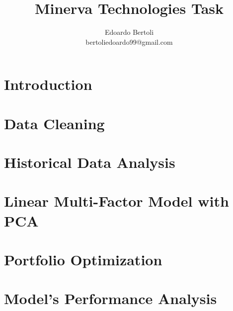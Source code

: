 \documentclass[a4paper,11pt]{article}
\title{Minerva Technologies Task}
\author{Edoardo Bertoli\\bertoliedoardo99@gmail.com}
\begin{document}
\maketitle


\tableofcontents
\thispagestyle{empty} 
\clearpage





\section{Introduction}
\label{intro}


\section{Data Cleaning}
\label{datacleaning}


\section{Historical Data Analysis}
\label{dataanalysis}


\section{Linear Multi-Factor Model with PCA}
\label{pca-apt}


\section{Portfolio Optimization}
\label{optimization}


\section{Model's Performance Analysis}
\label{model-testing}



\clearpage
{}
\printbibliography
\end{document}
